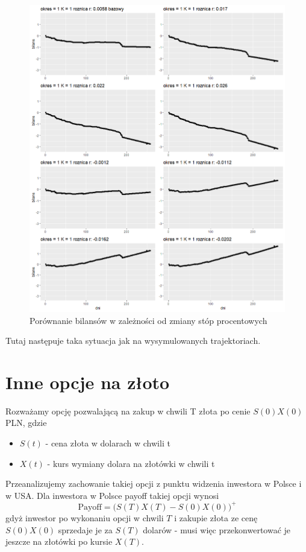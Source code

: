 \documentclass[12pt]{article}
\begin{document}
\begin{figure}[ht!]
\centering
\includegraphics[width=\linewidth]{bilans_prawdziwa_trajektoria_gold_zmiana_r_rowna_skala.png}
\caption{Porównanie bilansów w zależności od zmiany stóp procentowych}
\end{figure}

Tutaj następuje taka sytuacja jak na wysymulowanych trajektoriach.



\newpage

\section{Inne opcje na złoto}

Rozważamy opcję pozwalającą na zakup w chwili T złota po cenie $S(0)X(0)$ PLN, gdzie
\begin{itemize}
    \item $S(t)$ - cena złota w dolarach w chwili t
    \item $X(t)$ - kurs wymiany dolara na złotówki w chwili t
\end{itemize}
Przeanalizujemy zachowanie takiej opcji z punktu widzenia inwestora w Polsce i w USA. 
Dla inwestora w Polsce payoff takiej opcji wynosi 
\[
\text{Payoff} = \Big(S(T)X(T) - S(0)X(0)\Big)^+
\]
gdyż inwestor po wykonaniu opcji w chwili $T$ i zakupie złota ze cenę $S(0)X(0)$ sprzedaje je za $S(T)$ dolarów - musi więc przekonwertować je jeszcze na złotówki po kursie $X(T)$. 
\end{document}
